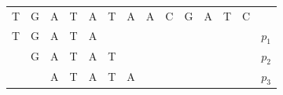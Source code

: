 \begin{center}
\begin{tabular}{cccccccccccccc}
 T&\hspace{-4mm}G&\hspace{-4mm}A&\hspace{-4mm}T&\hspace{-4mm}A&\hspace{-4mm}T&\hspace{-4mm}A&\hspace{-4mm}A&\hspace{-4mm}C&\hspace{-4mm}G&\hspace{-4mm}A&\hspace{-4mm}T&\hspace{-4mm}C&\\
 T&\hspace{-4mm}G&\hspace{-4mm}A&\hspace{-4mm}T&\hspace{-4mm}A&\hspace{-4mm}~&\hspace{-4mm}~&\hspace{-4mm}~&\hspace{-4mm}~&\hspace{-4mm}~&\hspace{-4mm}~&\hspace{-4mm}~&\hspace{-4mm}~&$p_1$\\
 ~&\hspace{-4mm}G&\hspace{-4mm}A&\hspace{-4mm}T&\hspace{-4mm}A&\hspace{-4mm}T&\hspace{-4mm}~&\hspace{-4mm}~&\hspace{-4mm}~&\hspace{-4mm}~&\hspace{-4mm}~&\hspace{-4mm}~&\hspace{-4mm}~&$p_2$\\
~&\hspace{-4mm}~&\hspace{-4mm}A&\hspace{-4mm}T&\hspace{-4mm}A&\hspace{-4mm}T&\hspace{-4mm}A&\hspace{-4mm}~&\hspace{-4mm}~&\hspace{-4mm}~&\hspace{-4mm}~&\hspace{-4mm}~&\hspace{-4mm}~&$p_3$\\

\end{tabular}
\end{center}
